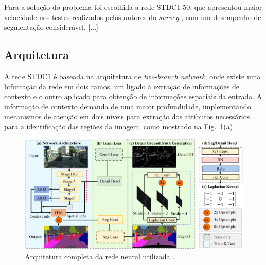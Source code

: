 \documentclass[conference]{IEEEtran}
\begin{document}
Para a solução do problema foi escolhida a rede STDC1-50, que apresentou maior velocidade nos testes realizados pelos autores do \textit{survey} \cite{papadeas2021RealTimeSemanticImage}, com um desempenho de segmentação considerável. [...]

\subsection{Arquitetura}

A rede STDC1 \cite{fan2021RethinkingBiSeNetRealtime} é baseada na arquitetura de \textit{two-branch network}, onde existe uma bifurcação da rede em dois ramos, um ligado à extração de informações de contexto e o outro aplicado para obtenção de informações espaciais da entrada. A informação de contexto demanda de uma maior profundidade, implementando mecanismos de atenção em dois níveis para extração dos atributos necessários para a identificação das regiões da imagem, como mostrado na Fig.~\ref{fig:stdcseg-architecture}(a).

\begin{figure}[h!]
	\centering
	\includegraphics[width=1\linewidth]{img/stdcseg-architecture}
	\caption{Arquitetura completa da rede neural utilizada \cite{fan2021RethinkingBiSeNetRealtime}.}
	\label{fig:stdcseg-architecture}
\end{figure}
\end{document}

